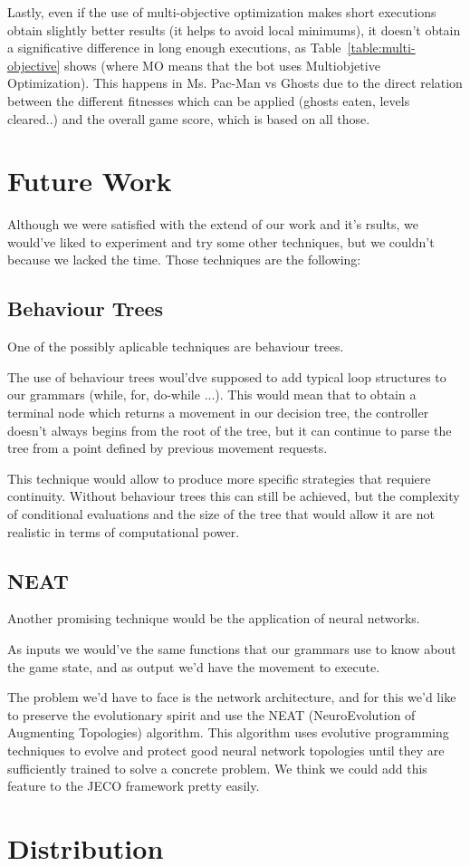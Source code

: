 Lastly, even if the use of multi-objective optimization makes short executions obtain slightly better results (it helps to avoid local minimums), it doesn’t obtain a significative difference in long enough executions, as Table~\ref{table:multi-objective} shows (where MO means that the bot uses Multiobjetive Optimization). This happens in Ms. Pac-Man vs Ghosts due to the direct relation between the different fitnesses which can be applied (ghosts eaten, levels cleared..) and the overall game score, which is based on all those.

\section{Future Work}
Although we were satisfied with the extend of our work and it's rsults, we would've liked to experiment and try some other techniques, but we couldn't because we lacked the time. Those techniques are the following:

\subsection{Behaviour Trees}
One of the possibly aplicable techniques are behaviour trees.

The use of behaviour trees woul'dve supposed to add typical loop structures to our grammars (while, for, do-while ...). This would mean that to obtain a terminal node which returns a movement in our decision tree, the controller doesn't always begins from the root of the tree, but it can continue to parse the tree from a point defined by previous movement requests.

This technique would allow to produce more specific strategies that requiere continuity. Without behaviour trees this can still be achieved, but the complexity of conditional evaluations and the size of the tree that would allow it are not realistic in terms of computational power.


\subsection{NEAT}

Another promising technique would be the application of neural networks.

As inputs we would've the same functions that our grammars use to know about the game state, and as output we'd have the movement to execute.

The problem we'd have to face is the network architecture, and for this we'd like to preserve the evolutionary spirit and use the NEAT (NeuroEvolution of Augmenting Topologies) algorithm. This algorithm uses evolutive programming techniques to evolve and protect good neural network topologies until they are sufficiently trained to solve a concrete problem. We think we could add this feature to the JECO framework pretty easily.

\section{Distribution}
